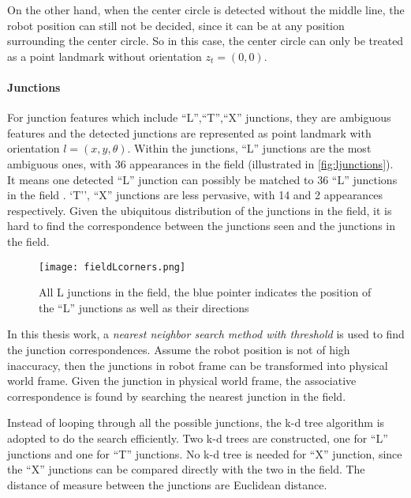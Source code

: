 On the other hand, when the center circle is detected without the middle line, the robot position can still not be decided, since it can be at any position surrounding the center circle. So in this case, the center circle can only be treated as a point landmark without orientation $z_t = (0,0)$.


\paragraph{Junctions}
For junction features which include ``L'',``T'',``X'' junctions, they are ambiguous features and the detected junctions are represented as point landmark with orientation $l = (x,y,\theta)$. Within the junctions, ``L'' junctions are the most ambiguous ones, with 36 appearances in the field (illustrated in \autoref{fig:ljunctions}). It means one detected ``L'' junction can possibly be matched to 36 ``L'' junctions in the field . `T'', ``X'' junctions are less pervasive, with 14 and 2 appearances respectively. Given the ubiquitous distribution of the junctions in the field, it is hard to find the correspondence between the junctions seen and the junctions in the field. \\
\begin{figure}[h!]
  \centering
  \texttt{[image: fieldLcorners.png]}
  \caption{All L junctions in the field, the blue pointer indicates the position of the ``L'' junctions as well as their directions}
  \label{fig:ljunctions}
\end{figure}

In this thesis work, a \textit{nearest neighbor search method with threshold} is used to find the junction correspondences. Assume the robot position is not of high inaccuracy, then the junctions in robot frame can be transformed into physical world frame. Given the junction in physical world frame, the associative correspondence is found by searching the nearest junction in the field. 

Instead of looping through all the possible junctions, the k-d tree algorithm \cite{Bentley1975} is adopted to do the search efficiently. Two k-d trees are constructed, one for ``L'' junctions and one for ``T'' junctions. No k-d tree is needed for ``X'' junction, since the ``X'' junctions can be compared directly with the two in the field. The distance of measure between the junctions are Euclidean distance. 


